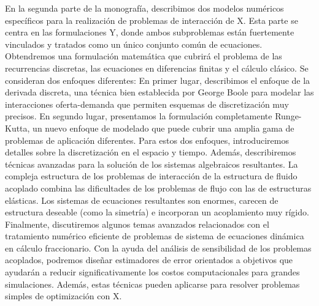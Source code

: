 En la segunda parte de la monografía, describimos dos modelos numéricos específicos para la realización de problemas de interacción de X. Esta parte se centra en las formulaciones Y, donde ambos subproblemas están fuertemente vinculados y tratados como un único conjunto común de ecuaciones. Obtendremos una formulación matemática que cubrirá el problema de las recurrencias discretas, las ecuaciones en diferencias finitas y el cálculo clásico. Se consideran dos enfoques diferentes: En primer lugar, describimos el enfoque de la derivada discreta, una técnica bien establecida por George Boole para modelar las interacciones oferta-demanda que permiten esquemas de discretización muy precisos. En segundo lugar, presentamos la formulación completamente Runge-Kutta, un nuevo enfoque de modelado que puede cubrir una amplia gama de problemas de aplicación diferentes. Para estos dos enfoques, introduciremos detalles sobre la discretización en el espacio y tiempo. Además, describiremos técnicas avanzadas para la solución de los sistemas algebraicos resultantes. La compleja estructura de los problemas de interacción de la estructura de fluido acoplado combina las dificultades de los problemas de flujo con las de estructuras elásticas. Los sistemas de ecuaciones resultantes son enormes, carecen de estructura deseable (como la simetría) e incorporan un acoplamiento muy rígido. Finalmente, discutiremos algunos temas avanzados relacionados con el tratamiento numérico eficiente de problemas de sistema de ecuaciones dinámica en cálculo fraccionario. Con la ayuda del análisis de sensibilidad de los problemas acoplados, podremos diseñar estimadores de error orientados a objetivos que ayudarán a reducir significativamente los costos computacionales para grandes simulaciones. Además, estas técnicas pueden aplicarse para resolver problemas simples de optimización con X.
